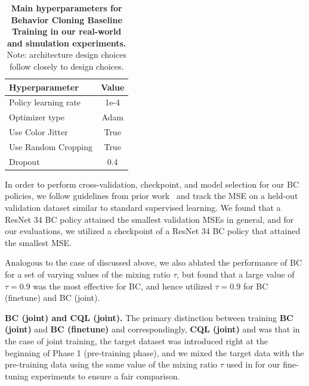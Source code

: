 \documentclass[../thesis.tex]{subfiles}
\begin{document}
\begin{table}[h]
\centering
\begin{tabular}{l|c}
\toprule
\textbf{Hyperparameter} & \textbf{Value}\\  \midrule
Policy learning rate & 1e-4 \\
Optimizer type & Adam \\
Use Color Jitter & True \\
Use Random Cropping & True \\
Dropout & 0.4 \\
\bottomrule
\end{tabular}
\vspace{0.07cm}
\caption{\footnotesize{\textbf{Main hyperparameters for Behavior Cloning Baseline Training in our real-world and simulation experiments.} Note: architecture design choices follow closely to \ptrmethodname design choices.}}
\label{tab:hparams_cql}
\vspace{-0.4cm}
\end{table}

In order to perform cross-validation, checkpoint, and model selection for our BC policies, we follow guidelines from prior work~\citep{ebert2021bridge,emmons2021rvs} and track the MSE on a held-out validation dataset similar to standard supervised learning. We found that a ResNet 34 BC policy attained the smallest validation MSEs in general, and for our evaluations, we utilized a checkpoint of a ResNet 34 BC policy that attained the smallest MSE.   

Analogous to the case of \ptrmethodname discussed above, we also ablated the performance of BC for a set of varying values of the mixing ratio $\tau$, but found that a large value of $\tau = 0.9$ was the most effective for BC, and hence utilized $\tau = 0.9$ for BC (finetune) and BC (joint).

\textbf{BC (joint) and CQL (joint).} The primary distinction between training \textbf{BC (joint)} and \textbf{BC (finetune)} and correspondingly, \textbf{CQL (joint)} and \ptrmethodname was that in the case of joint training, the target dataset was introduced right at the beginning of Phase 1 (pre-training phase), and we mixed the target data with the pre-training data using the same value of the mixing ratio $\tau$ used in for our fine-tuning experiments to ensure a fair comparison.
\end{document}
